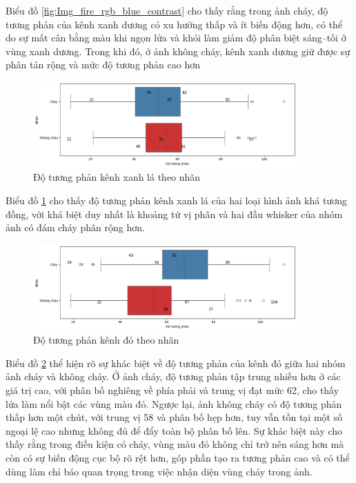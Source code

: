       Biểu đồ \ref{fig:Img_fire_rgb_blue_contrast} cho thấy rằng trong ảnh cháy, độ tương phản của kênh xanh dương có xu hướng thấp và ít biến động hơn, có thể do sự mất cân bằng màu khi ngọn lửa và khói làm giảm độ phân biệt sáng–tối ở vùng xanh dương. Trong khi đó, ở ảnh không cháy, kênh xanh dương giữ được sự phân tán rộng và mức độ tương phản cao hơn

    \begin{figure}[htp]
        \centering
        \includegraphics[width=0.90\textwidth]{images/Img_fire_rgb_green_contrast.png}
        \caption{Độ tương phản kênh xanh lá theo nhãn}
        \label{fig:Img_fire_rgb_green_contrast}
    \end{figure}
    \FloatBarrier

     Biểu đồ \ref{fig:Img_fire_rgb_green_contrast} cho thấy độ tương phản kênh xanh lá của hai loại hình ảnh khá tương đồng, với khá biệt duy nhất là khoảng tứ vị phân và hai đầu whisker của nhóm ảnh có đám cháy phân rộng hơn. 

    \begin{figure}[htp]
        \centering
        \includegraphics[width=0.90\textwidth]{images/Img_fire_rgb_red_contrast.png}
        \caption{Độ tương phản kênh đỏ theo nhãn}
        \label{fig:Img_fire_rgb_red_contrast}
    \end{figure}
    \FloatBarrier

    Biểu đồ \ref{fig:Img_fire_rgb_red_contrast} thể hiện rõ sự khác biệt về độ tương phản của kênh đỏ giữa hai nhóm ảnh cháy và không cháy. Ở ảnh cháy, độ tương phản tập trung nhiều hơn ở các giá trị cao, với phân bố nghiêng về phía phải và trung vị đạt mức 62, cho thấy lửa làm nổi bật các vùng màu đỏ. Ngược lại, ảnh không cháy có độ tương phản thấp hơn một chút, với trung vị 58 và phân bố hẹp hơn, tuy vẫn tồn tại một số ngoại lệ cao nhưng không đủ để đẩy toàn bộ phân bố lên. Sự khác biệt này cho thấy rằng trong điều kiện có cháy, vùng màu đỏ không chỉ trở nên sáng hơn mà còn có sự biến động cục bộ rõ rệt hơn, góp phần tạo ra tương phản cao và có thể dùng làm chỉ báo quan trọng trong việc nhận diện vùng cháy trong ảnh.


